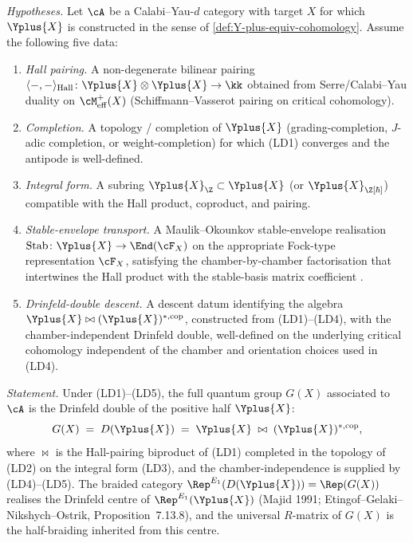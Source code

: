 \begin{theorem}
\emph{Hypotheses.} Let $\cA$ be a Calabi--Yau-$d$ category with target
$X$ for which $\Yplus{X}$ is constructed in the sense of
\cref{def:Y-plus-equiv-cohomology}. Assume the following five
data:
\begin{enumerate}[label=\textup{(LD\arabic*)}]
\item \emph{Hall pairing.}
A non-degenerate bilinear pairing $\langle -, - \rangle_{\mathrm{Hall}}
\colon \Yplus{X} \otimes \Yplus{X} \to \kk$ obtained from
Serre/Calabi--Yau duality on $\cM^+_{\mathrm{eff}}(X)$
\textup{(}Schiffmann--Vasserot pairing on critical
cohomology\textup{)}.
\item \emph{Completion.}
A topology / completion of $\Yplus{X}$ \textup{(}grading-completion,
$J$-adic completion, or weight-completion\textup{)} for which
\textup{(LD1)} converges and the antipode is well-defined.
\item \emph{Integral form.}
A subring $\Yplus{X}_{\Z} \subset \Yplus{X}$ \textup{(}or
$\Yplus{X}_{\Z[\hbar]}$\textup{)} compatible with the Hall product,
coproduct, and pairing.
\item \emph{Stable-envelope transport.}
A Maulik--Okounkov stable-envelope realisation
$\mathrm{Stab} \colon \Yplus{X} \to \End(\cF_X)$ on the appropriate
Fock-type representation $\cF_X$, satisfying the chamber-by-chamber
factorisation that intertwines the Hall product with the stable-basis
matrix coefficient \cite{MaulikOkounkov2012}.
\item \emph{Drinfeld-double descent.}
A descent datum identifying the algebra
$\Yplus{X} \bowtie (\Yplus{X})^{\ast,\mathrm{cop}}$,
constructed from \textup{(LD1)--(LD4)}, with the chamber-independent
Drinfeld double, well-defined on the underlying critical cohomology
independent of the chamber and orientation choices used in
\textup{(LD4)}.
\end{enumerate}

\emph{Statement.} Under \textup{(LD1)--(LD5)}, the full quantum group
$G(X)$ associated to $\cA$ is the Drinfeld double of the positive
half $\Yplus{X}$:
\begin{equation}
\label{eq:G-eq-D-Yplus}
 G(X) \;=\; \Drinfdouble{\Yplus{X}}
 \;=\; \Yplus{X} \;\bowtie\; (\Yplus{X})^{\ast,\mathrm{cop}},
\end{equation}
where $\bowtie$ is the Hall-pairing biproduct of \textup{(LD1)}
completed in the topology of \textup{(LD2)} on the integral form
\textup{(LD3)}, and the chamber-independence is supplied by
\textup{(LD4)--(LD5)}. The braided category
$\Rep^{E_1}(\Drinfdouble{\Yplus{X}}) = \Rep(G(X))$ realises the
Drinfeld centre of $\Rep^{E_1}(\Yplus{X})$
\textup{(}Majid 1991; Etingof--Gelaki--Nikshych--Ostrik,
Proposition~7.13.8\textup{)}, and the universal $R$-matrix of
$G(X)$ is the half-braiding inherited from this centre.


\end{theorem}
